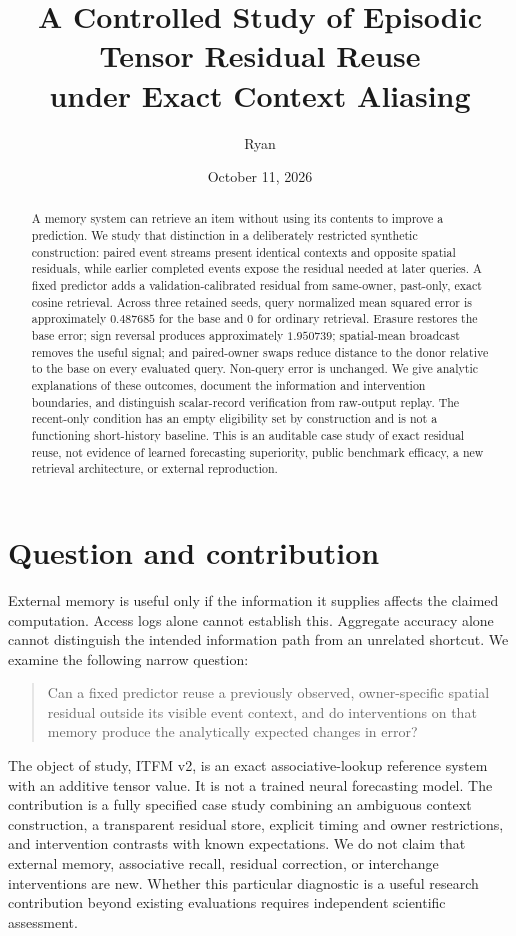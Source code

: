\documentclass[11pt]{article}
\title{A Controlled Study of Episodic Tensor Residual Reuse\\
under Exact Context Aliasing}
\author{Ryan}
\date{October 11, 2026}
\begin{document}
\maketitle
\begin{abstract}
A memory system can retrieve an item without using its contents to improve a
prediction. We study that distinction in a deliberately restricted synthetic
construction: paired event streams present identical contexts and opposite
spatial residuals, while earlier completed events expose the residual needed
at later queries. A fixed predictor adds a validation-calibrated residual from
same-owner, past-only, exact cosine retrieval. Across three retained seeds,
query normalized mean squared error is approximately $0.487685$ for the base
and $0$ for ordinary retrieval. Erasure restores the base error; sign reversal
produces approximately $1.950739$; spatial-mean broadcast removes the useful
signal; and paired-owner swaps reduce distance to the donor relative to the
base on every evaluated query. Non-query error is unchanged. We give analytic
explanations of these outcomes, document the information and intervention
boundaries, and distinguish scalar-record verification from raw-output replay.
The recent-only condition has an empty eligibility set by construction and is
not a functioning short-history baseline. This is an auditable case study of
exact residual reuse, not evidence of learned forecasting superiority, public
benchmark efficacy, a new retrieval architecture, or external reproduction.
\end{abstract}

\section{Question and contribution}
External memory is useful only if the information it supplies affects the
claimed computation. Access logs alone cannot establish this. Aggregate
accuracy alone cannot distinguish the intended information path from an
unrelated shortcut. We examine the following narrow question:
\begin{quote}
Can a fixed predictor reuse a previously observed, owner-specific spatial
residual outside its visible event context, and do interventions on that memory
produce the analytically expected changes in error?
\end{quote}
The object of study, ITFM v2, is an exact associative-lookup reference system
with an additive tensor value. It is not a trained neural forecasting model.
The contribution is a fully specified case study combining an ambiguous
context construction, a transparent residual store, explicit timing and owner
restrictions, and intervention contrasts with known expectations. We do not
claim that external memory, associative recall, residual correction, or
interchange interventions are new. Whether this particular diagnostic is a
useful research contribution beyond existing evaluations requires independent
scientific assessment.
\end{document}
